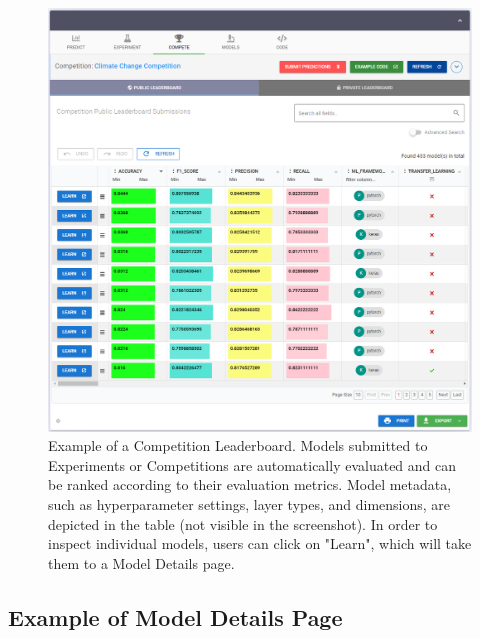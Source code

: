 \begin{figure}[h!]
  \centering
  \includegraphics[width=1\textwidth]{figures/competition.png}
  \caption{Example of a Competition Leaderboard. Models submitted to Experiments or Competitions are automatically evaluated and can be ranked according to their evaluation metrics. Model metadata, such as hyperparameter settings, layer types, and dimensions, are depicted in the table (not visible in the screenshot). In order to inspect individual models, users can click on "Learn", which will take them to a Model Details page.}
\end{figure}


\newpage
\subsection{Example of Model Details Page}
\label{app:model}

